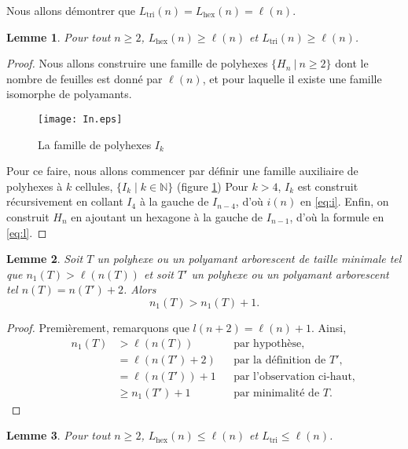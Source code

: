 \documentclass{article}
\newcommand\todoantoine[1]{\todo[inline]{Antoine : #1}}
\newtheorem{lem}{Lemme}[section]
\theoremstyle{definition}
\newcommand{\N}{\mathbb{N}}
\newcommand{\Lhex}{L_{\text{hex}}}
\newcommand{\Ltri}{L_{\text{tri}}}
\begin{document}
Nous allons démontrer que $\Ltri(n) = \Lhex(n) = \ell(n)$.

\begin{lem}
   Pour tout $n \geq 2$, $\Lhex(n) \geq \ell(n)$ et $\Ltri(n) \geq \ell(n)$.
\end{lem}
\begin{proof}
   Nous allons construire une famille de polyhexes 
   $\{ H_n\ |\ n \geq 2\}$ dont le nombre de feuilles est donné 
   par $\ell(n)$, et pour laquelle il existe une famille isomorphe 
   de polyamants.
   
   \begin{figure}[h!]
   \todoantoine{Remplacer $n$ par $k$}
   \caption{La famille de polyhexes $I_k$}
   \label{fig:Ik}
   \texttt{[image: In.eps]}
   \end{figure}

   Pour ce faire, nous allons commencer par définir une famille
   auxiliaire de polyhexes à $k$ cellules, $\{I_k \mid k \in \N\}$ 
   (figure \ref{fig:Ik})
   Pour $k>4$, $I_k$ est construit 
   récursivement en collant $I_4$ à la gauche de $I_{n-4}$, d'où $i(n)$ en
   \eqref{eq:i}.
   Enfin, on construit $H_n$ en ajoutant un hexagone à la gauche de $I_{n-1}$, d'où la formule en \eqref{eq:l}.
\end{proof}

\begin{lem}
   \label{lem:hyp}
   Soit $T$ un polyhexe ou un polyamant arborescent de taille minimale 
   tel que $n_1(T) > \ell(n(T))$ et soit $T'$ un polyhexe ou un 
   polyamant arborescent tel $n(T) = n(T') + 2$. Alors
   \[
      n_1(T) > n_1(T) + 1.
   \]
\end{lem}

\begin{proof}
   Premièrement, remarquons que $l(n + 2) = \ell(n) + 1$.
   Ainsi,
   \begin{align*}
      && n_1(T) &> \ell(n(T)) && \text{par hypothèse},\\
      &&      &= \ell(n(T') + 2) &&\text{par la définition de $T'$}, \\
      &&       &= \ell(n(T')) + 1 && \text{par l'observation ci-haut}, \\
      &&       &\geq n_1(T') + 1 && \text{par minimalité de $T$.}
   \end{align*}
\end{proof}

\begin{lem}
   Pour tout $n \geq 2$, $\Lhex(n) \leq \ell(n)$ et $\Ltri \leq \ell(n)$.
\end{lem}
\end{document}

